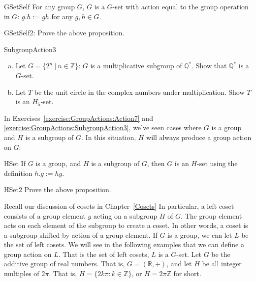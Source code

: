 \begin{prop}{GSetSelf} 
For any group $G$, $G$ is a $G$-set with action equal to the group operation in $G$: $g.h:=gh$ for any $g,h \in G$.
\end{prop}

\begin{exercise}{GSetSelf2}: 
Prove the above proposition.
\end {exercise}

\begin{exercise}{SubgroupAction3}
\begin{enumerate} [(a)]
\item Let $G=\{2^n~|~n \in \mathbb{Z}\}$: $G$ is a multiplicative subgroup of $\mathbb{Q}^*$. Show that $\mathbb{Q}^*$ is a $G$-set.
\item Let $T$ be the unit circle in the complex numbers under multiplication.  Show $T$ is an $H_5$-set.
\end{enumerate}
\end {exercise}

In Exercises~\ref{exercise:GroupActions:Action7} and \ref{exercise:GroupActions:SubgroupAction3}, we've seen cases where $G$ is a group and $H$ is a subgroup of $G$.  In this situation, $H$ will always produce a group action on $G$:

\begin{prop}{HSet} 
If $G$ is a group, and $H$ is a subgroup of $G$, then $G$ is an $H$-set using the definition $h.g:=hg$.
\end{prop}

\begin{exercise}{HSet2} 
Prove the above proposition.
\end {exercise}

Recall our discussion of cosets in Chapter~\ref{Cosets} In particular, a left coset consists of a group element $g$ acting on a subgroup $H$ of $G$. The group element acts on each element of the subgroup to create a coset. In other words, a coset is a subgroup shifted by action of a group element.  If $G$ is a group, we can let $L$ be the set of left cosets. We will see in the following examples that we can define a group action on $L$.  That is the set of left cosets, $L$ is a $G$-set.
Let $G$ be the additive group of real numbers.  That is, $G=(\mathbb{R},+)$, and let $H$ be all integer multiples of $2\pi$.   That is, $H=\{2k\pi:k\in \mathbb{Z}\}$, or $H = 2 \pi \mathbb{Z}$ for short.  

